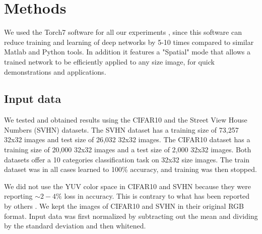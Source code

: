 \documentclass{article} %
\begin{document}


\section{Methods}
\label{sec-methods}


We used the Torch7 software for all our experiments \cite{collobert_torch7_2011}, since this software can reduce training and learning of deep networks by 5-10 times compared to similar Matlab and Python tools. In addition it features a "Spatial" mode that allows a trained network to be efficiently applied to any size image, for quick demonstrations and applications.


\subsection{Input data}

We tested and obtained results using the CIFAR10 \cite{krizhevsky_learning_2009} and the Street View House Numbers (SVHN) \cite{netzer_reading_2011} datasets. The SVHN dataset has a training size of 73,257 32x32 images and test size of 26,032 32x32 images. The CIFAR10 dataset has a training size of 20,000 32x32 images and a test size of 2,000 32x32 images. Both datasets offer a 10 categories classification task on 32x32 size images. The train dataset was in all cases learned to 100\% accuracy, and training was then stopped. 


We did not use the YUV color space in CIFAR10 and SVHN because they were reporting $\sim 2-4\%$ loss in accuracy. This is contrary to what has been reported by others \cite{jarrett_what_2009}. We kept the images of CIFAR10 and SVHN in their original RGB format. Input data was first normalized by subtracting out the mean and dividing by the standard deviation and then whitened.
\end{document}
